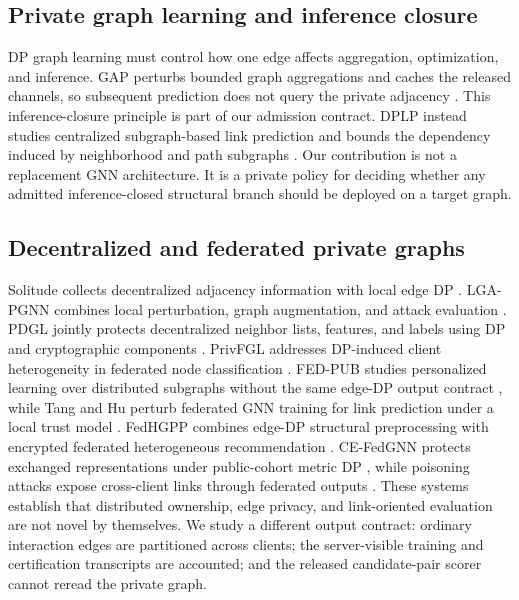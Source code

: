 \subsection{Private graph learning and inference closure}

DP graph learning must control how one edge affects aggregation, optimization,
and inference. GAP perturbs bounded graph aggregations and caches the released
channels, so subsequent prediction does not query the private adjacency
\cite{sajadmanesh2023gap}. This inference-closure principle is part of our
admission contract. DPLP instead studies centralized subgraph-based link
prediction and bounds the dependency induced by neighborhood and path
subgraphs \cite{ran2024dplp}. Our contribution is not a replacement GNN
architecture. It is a private policy for deciding whether any admitted
inference-closed structural branch should be deployed on a target graph.

\subsection{Decentralized and federated private graphs}

Solitude collects decentralized adjacency information with local edge DP
\cite{lin2022solitude}. LGA-PGNN combines local perturbation, graph
augmentation, and attack evaluation \cite{pei2024lga}. PDGL jointly protects
decentralized neighbor lists, features, and labels using DP and cryptographic
components \cite{li2025pdgl}. PrivFGL addresses DP-induced client
heterogeneity in federated node classification
\cite{zhang2025privfgl}. FED-PUB studies personalized learning over distributed
subgraphs without the same edge-DP output contract \cite{baek2023fedpub}, while
Tang and Hu perturb federated GNN training for link prediction under a local
trust model \cite{tang2025privacy}. FedHGPP combines edge-DP structural
preprocessing with encrypted federated heterogeneous recommendation
\cite{li2026fedhgpp}. CE-FedGNN protects exchanged representations under
public-cohort metric DP \cite{guo2026cefedgnn}, while poisoning attacks expose
cross-client links through federated outputs \cite{yang2026poisoning}. These
systems establish that distributed ownership,
edge privacy, and link-oriented evaluation are not novel by themselves. We
study a different output contract:
ordinary interaction edges are partitioned across clients; the server-visible
training and certification transcripts are accounted; and the released
candidate-pair scorer cannot reread the private graph.


